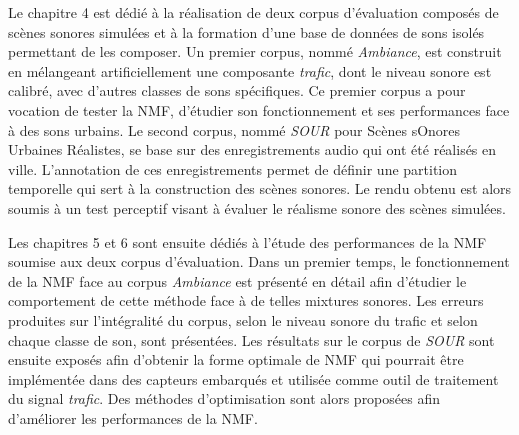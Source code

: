 Le chapitre 4 est dédié à la réalisation de deux corpus d'évaluation composés de scènes sonores simulées et à la formation d'une base de données de sons isolés permettant de les composer. 
Un premier corpus, nommé \textit{Ambiance}, est construit en mélangeant artificiellement une composante \textit{trafic}, dont le niveau sonore est calibré, avec d'autres classes de sons spécifiques. Ce premier corpus a pour vocation de tester la NMF, d'étudier son fonctionnement et ses performances face à des sons urbains. 
Le second corpus, nommé \textit{SOUR} pour Scènes sOnores Urbaines Réalistes, se base sur des enregistrements audio qui ont été réalisés en ville.
L'annotation de ces enregistrements permet de définir une partition temporelle qui sert à la construction des scènes sonores. Le rendu obtenu est alors soumis à un test perceptif visant à évaluer le réalisme sonore des scènes simulées. 

Les chapitres 5 et 6 sont ensuite dédiés à l'étude des performances de la NMF soumise aux deux corpus d'évaluation. Dans un premier temps, le fonctionnement de la NMF face au corpus \textit{Ambiance} est présenté en détail afin d'étudier le comportement de cette méthode face à de telles mixtures sonores. Les erreurs produites sur l'intégralité du corpus, selon le niveau sonore du trafic et selon chaque classe de son, sont présentées. 
Les résultats sur le corpus de \textit{SOUR} sont ensuite exposés afin d'obtenir la forme optimale de NMF qui pourrait être implémentée dans des capteurs embarqués et utilisée comme outil de traitement du signal \textit{trafic}. Des méthodes d'optimisation sont alors proposées afin d'améliorer les performances de la NMF.